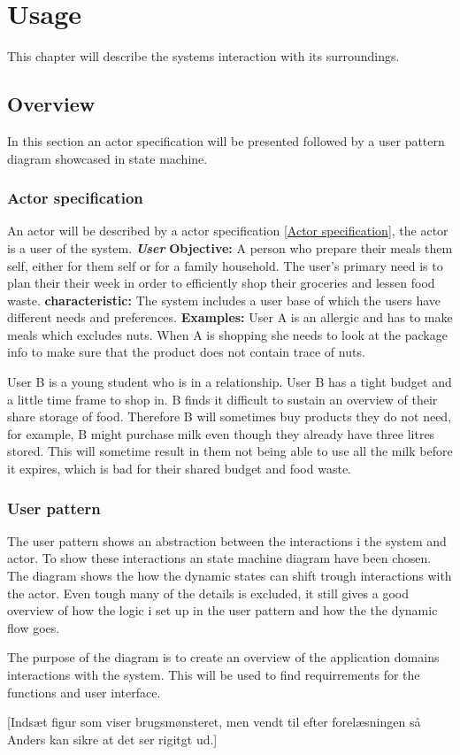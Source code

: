 \chapter{Usage}
This chapter will describe the systems interaction with its surroundings.

\section{Overview}
In this section an actor specification will be presented followed by a user pattern diagram showcased in state machine.

\subsection{Actor specification}
An actor will be described by a actor specification \ref{Actor specification}, the actor is a user of the system.
\vline
\textbf{\textit{User}}\label{Actor specification}
\textbf{Objective:} A person who prepare their meals them self, either for them self or for a family household. The user's primary need is to plan their their week in order to efficiently shop their groceries and lessen food waste.
\textbf{characteristic:} The system includes a user base of which the users have different needs and preferences.
\textbf{Examples:} User A is an allergic and has to make meals which excludes nuts. When A is shopping she needs to look at the package info to make sure that the product does not contain trace of nuts.

User B is a young student who is in a relationship. User B has a tight budget and a little time frame to shop in. B finds it difficult to sustain an overview of their share storage of food. Therefore B will sometimes buy products they do not need, for example, B might purchase milk even though they already have three litres stored. This will sometime result in them not being able to use all the milk before it expires, which is bad for their shared budget and food waste.
\vline

\subsection{User pattern}
The user pattern shows an abstraction between the interactions i the system and actor. To show these interactions an state machine diagram have been chosen. The diagram shows the how the dynamic states can shift trough interactions with the actor. Even tough many of the details is excluded, it still gives a good overview of how the logic i set up in the user pattern and how the the dynamic flow goes. 

The purpose of the diagram is to create an overview of the application domains interactions with the system. This will be used to find requirrements for the functions and user interface.

[Indsæt figur som viser brugsmønsteret, men vendt til efter forelæsningen så Anders kan sikre at det ser rigitgt ud.]